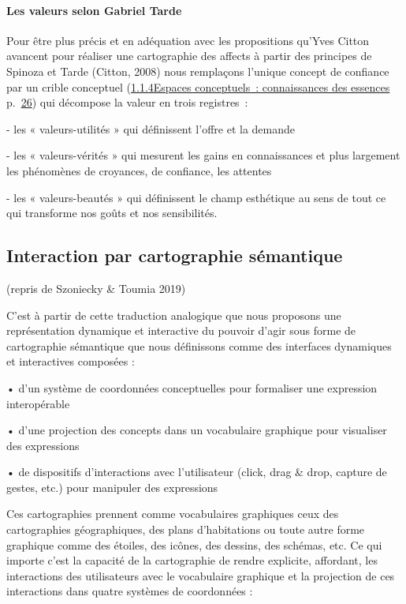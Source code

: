 \documentclass[
  a4paper,
  DIV=11,
  numbers=noendperiod]{scrreprt}
\let\oldparagraph\paragraph
\renewcommand{\paragraph}[1]{\oldparagraph{#1}\mbox{}}
\begin{document}
\paragraph{Les valeurs selon Gabriel
Tarde}\label{les-valeurs-selon-gabriel-tarde}

Pour être plus précis et en adéquation avec les propositions qu'Yves
Citton avancent pour réaliser une cartographie des affects à partir des
principes de Spinoza et Tarde (Citton, 2008) nous remplaçons l'unique
concept de confiance par un crible conceptuel
(\hyperref[anchor-13]{1.1.4Espaces conceptuels~: connaissances des
essences} p.~\hyperref[anchor-13]{26}) qui décompose la valeur en trois
registres~:

- les « valeurs-utilités » qui définissent l'offre et la demande

- les « valeurs-vérités » qui mesurent les gains en connaissances et
plus largement les phénomènes de croyances, de confiance, les attentes

- les « valeurs-beautés » qui définissent le champ esthétique au sens de
tout ce qui transforme nos goûts et nos sensibilités.

\subsection{Interaction par cartographie
sémantique}\label{sec-cartoSemantique}

(repris de Szoniecky \& Toumia 2019)

C'est à partir de cette traduction analogique que nous proposons une
représentation dynamique et interactive du pouvoir d'agir sous forme de
cartographie sémantique que nous définissons comme des interfaces
dynamiques et interactives composées :

• d'un système de coordonnées conceptuelles pour formaliser une
expression interopérable

• d'une projection des concepts dans un vocabulaire graphique pour
visualiser des expressions

• de dispositifs d'interactions avec l'utilisateur (click, drag \& drop,
capture de gestes, etc.) pour manipuler des expressions

Ces cartographies prennent comme vocabulaires graphiques ceux des
cartographies géographiques, des plans d'habitations ou toute autre
forme graphique comme des étoiles, des icônes, des dessins, des schémas,
etc. Ce qui importe c'est la capacité de la cartographie de rendre
explicite, affordant, les interactions des utilisateurs avec le
vocabulaire graphique et la projection de ces interactions dans quatre
systèmes de coordonnées :
\end{document}
